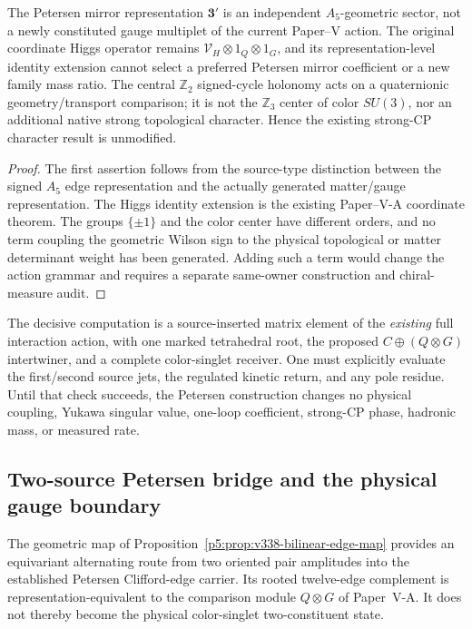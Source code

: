 \documentclass[12pt,a4paper]{article}
\begin{document}
\begin{proposition}
\label{p5c:prop:v321-petersen-no-automatic-insertion}
The Petersen mirror representation $\mathbf3'$ is an independent
$A_5$-geometric sector, not a newly constituted gauge multiplet of the
current Paper--V action. The original coordinate Higgs operator remains
$\mathcal V_H\otimes 1_Q\otimes1_G$, and its representation-level identity
extension cannot select a preferred Petersen mirror coefficient or a new
family mass ratio. The central $\mathbb Z_2$ signed-cycle holonomy acts on
a quaternionic geometry/transport comparison; it is not the $\mathbb Z_3$
center of color $SU(3)$, nor an additional native strong topological
character. Hence the existing strong-CP character result is unmodified.
\end{proposition}
\begin{proof}
The first assertion follows from the source-type distinction between the
signed $A_5$ edge representation and the actually generated matter/gauge
representation. The Higgs identity extension is the existing Paper--V-A
coordinate theorem. The groups $\{\pm1\}$ and the color center have
different orders, and no term coupling the geometric Wilson sign to the
physical topological or matter determinant weight has been generated.
Adding such a term would change the action grammar and requires a separate
same-owner construction and chiral-measure audit.
\end{proof}

\begin{remark}
The decisive computation is a source-inserted matrix element of the
\emph{existing} full interaction action, with one marked tetrahedral
root, the proposed $C\oplus(Q\otimes G)$ intertwiner, and a complete
color-singlet receiver. One must explicitly evaluate the first/second
source jets, the regulated kinetic return, and any pole residue. Until
that check succeeds, the Petersen construction changes no physical
coupling, Yukawa singular value, one-loop coefficient, strong-CP phase,
hadronic mass, or measured rate.
\end{remark}




\subsection{Two-source Petersen bridge and the physical gauge boundary}
\label{p5c:sec:v338-two-source-gauge-boundary}
The geometric map of Proposition~\ref{p5:prop:v338-bilinear-edge-map}
provides an equivariant alternating route from two oriented pair
amplitudes into the established Petersen Clifford-edge carrier.
Its rooted twelve-edge complement is representation-equivalent to
the comparison module $Q\otimes G$ of Paper~V-A.  It does not
thereby become the physical color-singlet two-constituent state.
\end{document}
